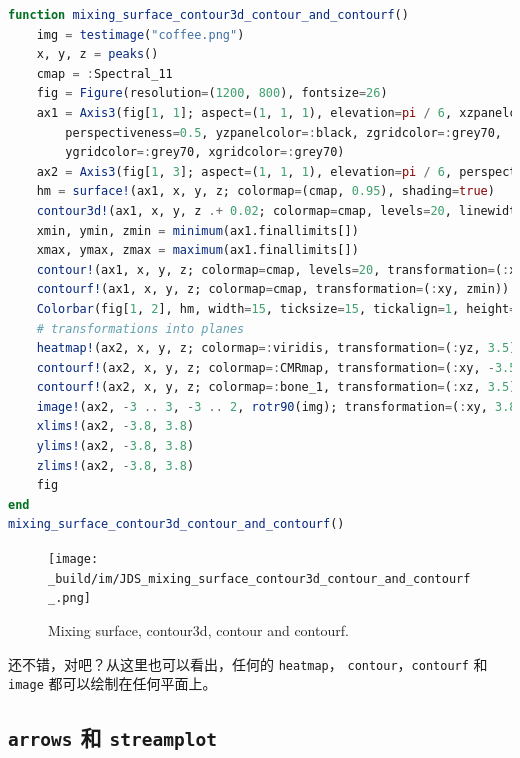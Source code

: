 \documentclass[
  notoc %
]{tufte-book}
\newcommand{\passthrough}[1]{#1}
\begin{document}
\begin{lstlisting}[language=Julia]
function mixing_surface_contour3d_contour_and_contourf()
    img = testimage("coffee.png")
    x, y, z = peaks()
    cmap = :Spectral_11
    fig = Figure(resolution=(1200, 800), fontsize=26)
    ax1 = Axis3(fig[1, 1]; aspect=(1, 1, 1), elevation=pi / 6, xzpanelcolor=(:black, 0.75),
        perspectiveness=0.5, yzpanelcolor=:black, zgridcolor=:grey70,
        ygridcolor=:grey70, xgridcolor=:grey70)
    ax2 = Axis3(fig[1, 3]; aspect=(1, 1, 1), elevation=pi / 6, perspectiveness=0.5)
    hm = surface!(ax1, x, y, z; colormap=(cmap, 0.95), shading=true)
    contour3d!(ax1, x, y, z .+ 0.02; colormap=cmap, levels=20, linewidth=2)
    xmin, ymin, zmin = minimum(ax1.finallimits[])
    xmax, ymax, zmax = maximum(ax1.finallimits[])
    contour!(ax1, x, y, z; colormap=cmap, levels=20, transformation=(:xy, zmax))
    contourf!(ax1, x, y, z; colormap=cmap, transformation=(:xy, zmin))
    Colorbar(fig[1, 2], hm, width=15, ticksize=15, tickalign=1, height=Relative(0.35))
    # transformations into planes
    heatmap!(ax2, x, y, z; colormap=:viridis, transformation=(:yz, 3.5))
    contourf!(ax2, x, y, z; colormap=:CMRmap, transformation=(:xy, -3.5))
    contourf!(ax2, x, y, z; colormap=:bone_1, transformation=(:xz, 3.5))
    image!(ax2, -3 .. 3, -3 .. 2, rotr90(img); transformation=(:xy, 3.8))
    xlims!(ax2, -3.8, 3.8)
    ylims!(ax2, -3.8, 3.8)
    zlims!(ax2, -3.8, 3.8)
    fig
end
mixing_surface_contour3d_contour_and_contourf()
\end{lstlisting}

\begin{figure}
\hypertarget{fig:mixing_surface_contour3d_contour_and_contourf}{%
\centering
\texttt{[image: \_build/im/JDS\_mixing\_surface\_contour3d\_contour\_and\_contourf\_.png]}
\caption{Mixing surface, contour3d, contour and
contourf.}\label{fig:mixing_surface_contour3d_contour_and_contourf}
}
\end{figure}

还不错，对吧？从这里也可以看出，任何的
\passthrough{\lstinline!heatmap!}，
\passthrough{\lstinline!contour!}，\passthrough{\lstinline!contourf!} 和
\passthrough{\lstinline!image!} 都可以绘制在任何平面上。

\hypertarget{arrows-ux548c-streamplot}{%
\subsection{\texorpdfstring{\texttt{arrows} 和
\texttt{streamplot}}{arrows 和 streamplot}}\label{arrows-ux548c-streamplot}}
\end{document}
